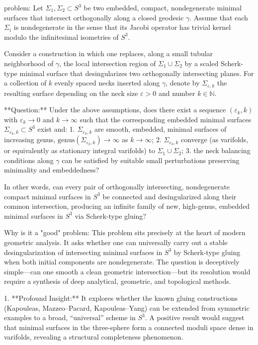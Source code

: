 problem:  
Let $\Sigma_1, \Sigma_2 \subset S^3$ be two embedded, compact, nondegenerate minimal surfaces that intersect orthogonally along a closed geodesic $\gamma$. Assume that each $\Sigma_i$ is nondegenerate in the sense that its Jacobi operator has trivial kernel modulo the infinitesimal isometries of $S^3$.  

Consider a construction in which one replaces, along a small tubular neighborhood of $\gamma$, the local intersection region of $\Sigma_1 \cup \Sigma_2$ by a scaled Scherk-type minimal surface that desingularizes two orthogonally intersecting planes. For a collection of $k$ evenly spaced necks inserted along $\gamma$, denote by $\Sigma_{\varepsilon,k}$ the resulting surface depending on the neck size $\varepsilon>0$ and number $k\in\mathbb{N}$.  

**Question:**  
Under the above assumptions, does there exist a sequence $(\varepsilon_k,k)$ with $\varepsilon_k \to 0$ and $k \to \infty$ such that the corresponding embedded minimal surfaces $\Sigma_{\varepsilon_k,k}\subset S^3$ exist and:  
1. $\Sigma_{\varepsilon_k,k}$ are smooth, embedded, minimal surfaces of increasing genus, $\mathrm{genus}(\Sigma_{\varepsilon_k,k}) \to \infty$ as $k \to \infty$;  
2. $\Sigma_{\varepsilon_k,k}$ converge (as varifolds, or equivalently as stationary integral varifolds) to $\Sigma_1 \cup \Sigma_2$;  
3. the neck balancing conditions along $\gamma$ can be satisfied by suitable small perturbations preserving minimality and embeddedness?  

In other words, can every pair of orthogonally intersecting, nondegenerate compact minimal surfaces in $S^3$ be connected and desingularized along their common intersection, producing an infinite family of new, high-genus, embedded minimal surfaces in $S^3$ via Scherk-type gluing?  

Why is it a "good" problem:  
This problem sits precisely at the heart of modern geometric analysis. It asks whether one can universally carry out a stable desingularization of intersecting minimal surfaces in $S^3$ by Scherk-type gluing when both initial components are nondegenerate. The question is deceptively simple—can one smooth a clean geometric intersection—but its resolution would require a synthesis of deep analytical, geometric, and topological methods.  

1. **Profound Insight:**  
It explores whether the known gluing constructions (Kapouleas, Mazzeo–Pacard, Kapouleas–Yang) can be extended from symmetric examples to a broad, “universal” scheme in $S^3$. A positive result would suggest that minimal surfaces in the three-sphere form a connected moduli space dense in varifolds, revealing a structural completeness phenomenon.

